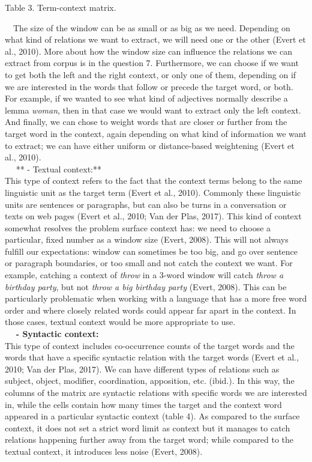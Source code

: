 \documentclass[11pt]{article}
\begin{document}
Table 3. Term-context matrix.

  The size of the window can be as small or as big as we need. Depending
on what kind of relations we want to extract, we will need one or the
other (Evert et al., 2010). More about how the window size can influence
the relations we can extract from corpus is in the question 7.
Furthermore, we can choose if we want to get both the left and the right
context, or only one of them, depending on if we are interested in the
words that follow or precede the target word, or both. For example, if
we wanted to see what kind of adjectives normally describe a lemma
\emph{woman}, then in that case we would want to extract only the left
context. And finally, we can chose to weight words that are closer or
further from the target word in the context, again depending on what
kind of information we want to extract; we can have either uniform or
distance-based weightening (Evert et al., 2010).\\
    ** - Textual context:**\\
This type of context refers to the fact that the context terms belong to
the same linguistic unit as the target term (Evert et al., 2010).
Commonly these linguistic units are sentences or paragraphs, but can
also be turns in a conversation or texts on web pages (Evert et al.,
2010; Van der Plas, 2017). This kind of context somewhat resolves the
problem surface context has: we need to choose a particular, fixed
number as a window size (Evert, 2008). This will not always fulfill our
expectations: window can sometimes be too big, and go over sentence or
paragraph boundaries, or too small and not catch the context we want.
For example, catching a context of \emph{throw} in a 3-word window will
catch \emph{throw a birthday party}, but not \emph{throw a big birthday
party} (Evert, 2008). This can be particularly problematic when working
with a language that has a more free word order and where closely
related words could appear far apart in the context. In those cases,
textual context would be more appropriate to use.\\
    \textbf{- Syntactic context:}\\
This type of context includes co-occurrence counts of the target words
and the words that have a specific syntactic relation with the target
words (Evert et al., 2010; Van der Plas, 2017). We can have different
types of relations such as subject, object, modifier, coordination,
apposition, etc. (ibid.). In this way, the columns of the matrix are
syntactic relations with specific words we are interested in, while the
cells contain how many times the target and the context word appeared in
a particular syntactic context (table 4). As compared to the surface
context, it does not set a strict word limit as context but it manages
to catch relations happening further away from the target word; while
compared to the textual context, it introduces less noise (Evert, 2008).
\end{document}
